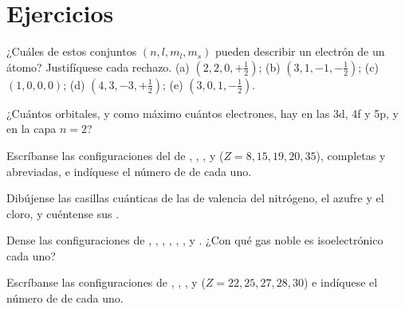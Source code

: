 \section{Ejercicios}

\begin{exercise}[$\star$]\label{exo:b1:quantum-numbers:1}
¿Cuáles de estos conjuntos $(n, l, m_l, m_s)$ pueden describir un
electrón de un átomo? Justifíquese cada rechazo.
(a) $(2, 2, 0, +\tfrac12)$; (b) $(3, 1, -1, -\tfrac12)$;
(c) $(1, 0, 0, 0)$; (d) $(4, 3, -3, +\tfrac12)$; (e) $(3, 0, 1, -\tfrac12)$.
\end{exercise}

\begin{exercise}[$\star$]\label{exo:b1:quantum-numbers:2}
¿Cuántos orbitales, y como máximo cuántos electrones, hay en las
 3d, 4f y 5p, y en la capa $n = 2$?
\end{exercise}

\begin{exercise}[$\star$]\label{exo:b1:quantum-numbers:3}
Escríbanse las configuraciones del  de , ,
,  y  ($Z = 8, 15, 19, 20, 35$), completas y
abreviadas, e indíquese el número de  de cada uno.
\end{exercise}

\begin{exercise}[$\star$]\label{exo:b1:quantum-numbers:4}
Dibújense las casillas cuánticas de las  de valencia del
nitrógeno, el azufre y el cloro, y cuéntense sus .
\end{exercise}

\begin{exercise}[$\star\star$]\label{exo:b1:quantum-numbers:5}
Dense las configuraciones de , , , ,
, ,  y . ¿Con qué gas noble es
isoelectrónico cada uno?
\end{exercise}

\begin{exercise}[$\star\star$]\label{exo:b1:quantum-numbers:6}
Escríbanse las configuraciones de , , ,
 y  ($Z = 22, 25, 27, 28, 30$) e indíquese el
número de  de cada uno.
\end{exercise}

